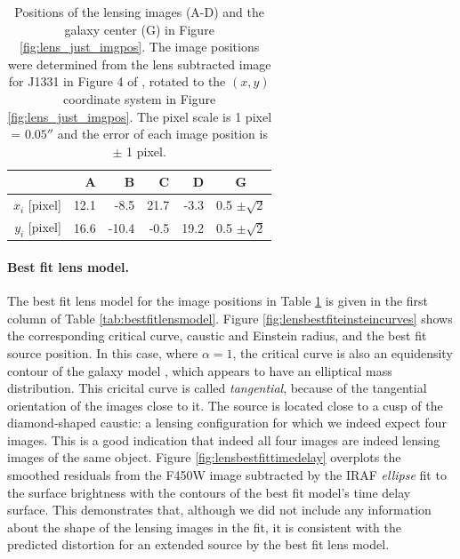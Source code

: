 \begin{table}
\centering
\begin{minipage}{70mm}
\begin{tabular}{r|rrrr|c}
\hline
  & A & B & C & D & G\\\hline
$x_i$ [pixel] & 12.1 & -8.5 & 21.7 & -3.3 & 0.5 $\pm \sqrt{2}$ \\
$y_i$ [pixel] & 16.6 & -10.4 & -0.5 & 19.2 & 0.5 $\pm \sqrt{2}$ \\
\hline
\end{tabular}
\caption{Positions of the lensing images (A-D) and the galaxy center (G) in Figure \ref{fig:lens_just_imgpos}. The image positions were determined from the lens subtracted image for J1331 in Figure 4 of \citet{SWELLSIII}, rotated to the $(x,y)$ coordinate system in Figure \ref{fig:lens_just_imgpos}. The pixel scale is 1 pixel = $0.05''$ and the error of each image position is $\pm$ 1 pixel.}
\label{tab:lenspos}
\end{minipage}
\end{table}


\paragraph{Best fit lens model.} The best fit lens model for the image positions in Table \ref{tab:lenspos} is given in the first column of Table \ref{tab:bestfitlensmodel}. Figure \ref{fig:lensbestfiteinsteincurves} shows the corresponding critical curve, caustic and Einstein radius, and the best fit source position. In this case, where $\alpha=1$, the critical curve is also an equidensity contour of the galaxy model \citep{EvansWitt}, which appears to have an elliptical mass distribution. This cricital curve is called \emph{tangential}, because of the tangential orientation of the images close to it. The source is located close to a cusp of the diamond-shaped caustic: a lensing configuration for which we indeed expect four images. This is a good indication that indeed all four images are indeed lensing images of the same object. Figure \ref{fig:lensbestfittimedelay} overplots the smoothed residuals from the F450W image subtracted by the IRAF \emph{ellipse} fit to the surface brightness with the contours of the best fit model's time delay surface. This demonstrates that, although we did not include any information about the shape of the lensing images in the fit, it is consistent with the predicted distortion for an extended source by the best fit lens model.


